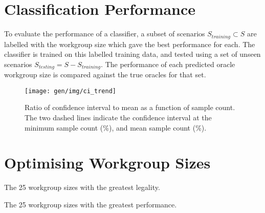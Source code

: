 

\section{Classification Performance}


To evaluate the performance of a classifier, a subset of scenarios
$S_{training} \subset S$ are labelled with the workgroup size which
gave the best performance for each. The classifier is trained on this
labelled training data, and tested using a set of unseen scenarios
$S_{testing} = S - S_{training}$. The performance of each predicted
oracle workgroup size is compared against the true oracles for that
set. %


\begin{figure}
\centering
\texttt{[image: gen/img/ci\_trend]}
\caption{%
  Ratio of confidence interval to mean as a function of sample
  count. The two dashed lines indicate the confidence interval at the
  minimum sample count (\%), and mean sample count
  (\%).%
}
\label{fig:ci-trends}
\end{figure}






\section{Optimising Workgroup Sizes}

%


\begin{table}
  \parbox{.45\linewidth}{
    \centering
    \scriptsize
    
    \caption{The 25 workgroup sizes with the greatest legality.}
  }
  \hfill
  \parbox{.45\linewidth}{
    \centering
    \scriptsize
    
    \caption{The 25 workgroup sizes with the greatest performance.}
  }
\end{table}


